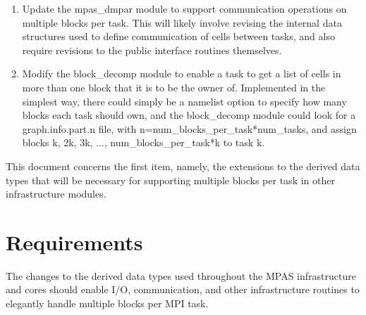\documentclass[11pt]{report}
\begin{document}
\begin{enumerate}
\item Update the mpas\_dmpar module to support communication operations on                              
   multiple blocks per task. This will likely involve revising the                                  
   internal data structures used to define communication of cells                                   
   between tasks, and also require revisions to the public interface                                
   routines themselves.                                                                             
                                                                                                    
\item Modify the block\_decomp module to enable a task to get a list of                                 
   cells in more than one block that it is to be the owner of.                                      
   Implemented in the simplest way, there could simply be a namelist                                
   option to specify how many blocks each task should own, and the                                  
   block\_decomp module could look for a graph.info.part.n file, with                                
   n=num\_blocks\_per\_task*num\_tasks, and assign blocks k, 2k, 3k, ...,                               
   num\_blocks\_per\_task*k to task k.    

\end{enumerate}                                                             
                                                                                                    
This document concerns the first item, namely, the extensions to the derived data
types that will be necessary for supporting multiple blocks per task in other infrastructure
modules.       


%
%
\chapter{Requirements}

The changes to the derived data types used throughout the MPAS infrastructure and cores
should enable I/O, communication, and other infrastructure routines to elegantly handle multiple blocks per MPI task.
\end{document}
